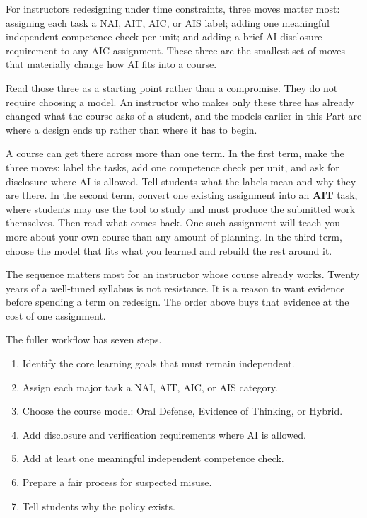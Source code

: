 \documentclass{SIAMbook2023}
\newcommand{\AIT}{\textcolor{catAIT}{\textbf{AIT}}}
\begin{document}
For instructors redesigning under time constraints, three moves matter most: assigning each task a NAI, AIT, AIC, or AIS label; adding one meaningful independent-competence check per unit; and adding a brief AI-disclosure requirement to any AIC assignment. These three are the smallest set of moves that materially change how AI fits into a course.

Read those three as a starting point rather than a compromise. They do not require choosing a model. An instructor who makes only these three has already changed what the course asks of a student, and the models earlier in this Part are where a design ends up rather than where it has to begin.

A course can get there across more than one term. In the first term, make the three moves: label the tasks, add one competence check per unit, and ask for disclosure where AI is allowed. Tell students what the labels mean and why they are there. In the second term, convert one existing assignment into an \AIT{} task, where students may use the tool to study and must produce the submitted work themselves. Then read what comes back. One such assignment will teach you more about your own course than any amount of planning. In the third term, choose the model that fits what you learned and rebuild the rest around it.

The sequence matters most for an instructor whose course already works. Twenty years of a well-tuned syllabus is not resistance. It is a reason to want evidence before spending a term on redesign. The order above buys that evidence at the cost of one assignment.

The fuller workflow has seven steps.

\begin{enumerate}
\item Identify the core learning goals that must remain independent.
\item Assign each major task a NAI, AIT, AIC, or AIS category.
\item Choose the course model: Oral Defense, Evidence of Thinking, or Hybrid.
\item Add disclosure and verification requirements where AI is allowed.
\item Add at least one meaningful independent competence check.
\item Prepare a fair process for suspected misuse.
\item Tell students why the policy exists.
\end{enumerate}
\end{document}
